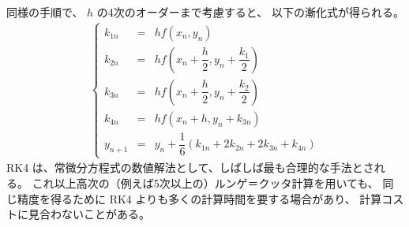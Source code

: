 \documentclass[uplatex,a4j,12pt,dvipdfmx]{jsarticle}
\begin{document}
同様の手順で、
$h$ の4次のオーダーまで考慮すると、
以下の漸化式が得られる。
\begin{eqnarray}
	\left\{
	\begin{array}{rcl}
		k_{1n}
		 & = &
		h f(x_{n},y_{n})
		\\[2mm]
		k_{2n}
		 & = &
		h f(x_{n}+\dfrac{h}{2},y_{n}+\dfrac{k_{1}}{2})
		\\[2mm]
		k_{3n}
		 & = &
		h f(x_{n}+\dfrac{h}{2},y_{n}+\dfrac{k_{2}}{2})
		\\[2mm]
		k_{4n}
		 & = &
		h f(x_{n}+h,y_{n}+k_{3n})
		\\[2mm]
		y_{n+1}
		 & = &
		y_{n} + \dfrac{1}{6} (k_{1n} + 2 k_{2n} + 2 k_{3n} + k_{4n})
	\end{array}
	\right.
\end{eqnarray}
RK4 は、常微分方程式の数値解法として、しばしば最も合理的な手法とされる。
これ以上高次の（例えば5次以上の）ルンゲ＝クッタ計算を用いても、
同じ精度を得るために RK4 よりも多くの計算時間を要する場合があり、
計算コストに見合わないことがある。
\end{document}
